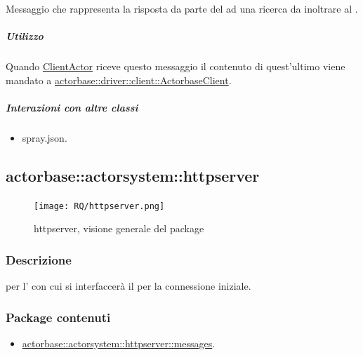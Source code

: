 \documentclass{scalatekids-article}
\begin{document}
Messaggio che rappresenta la risposta da parte del  ad una ricerca da inoltrare
al .

\subparagraph{Utilizzo}

Quando \hyperref[sec:actorbase::actorsystem::clientactor::ClientActor]{ClientActor}
riceve questo messaggio il contenuto di quest'ultimo viene
mandato a \hyperref[sec:actorbase::driver::client::ActorbaseClient]{actorbase::driver::\allowbreak{}client::\allowbreak{}ActorbaseClient}.

\subparagraph{Interazioni con altre classi}

\begin{itemize}
\item spray.json.
\end{itemize}


\subsection{actorbase::actorsystem::httpserver} %
\label{sec:actorbase::actorsystem::httpserver}

\begin{figure}[H]
  \begin{center}
    \texttt{[image: RQ/httpserver.png]}
    \caption{httpserver, visione generale del package}
  \end{center}
\end{figure}

\subsubsection{Descrizione}
 per l' con cui si interfaccerà il  per la connessione iniziale.

\subsubsection{Package contenuti}
\begin{itemize}
\item \hyperref[sec:actorbase::actorsystem::httpserver::messages]{actorbase::actorsystem::httpserver::messages}.
\end{itemize}
\end{document}
